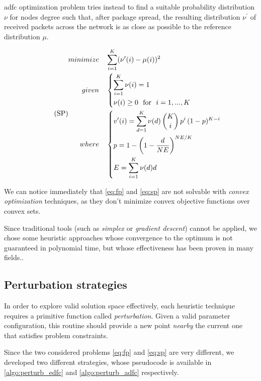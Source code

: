 \documentclass[12pt,journal,draftclsnofoot,onecolumn]{IEEEtran}
\begin{document}
\bigbreak

\gls{adfc} optimization problem tries instead to find a suitable probability distribution $\nu$ for nodes degree such that, after package spread, the resulting distribution $\nu^\prime$ of received packets across the network is as close as possible to the reference distribution $\mu$.

\begin{equation}
	\label{eq:sp}
	\tag{SP}
	\begin{split}
		minimize & \quad \sum_{i=1}^{K}(\nu'(i)-\mu(i))^2 \\
		given & \quad \begin{dcases}
			\sum_{i=1}^K \nu(i) = 1 \\
			\nu(i) \geq 0 \text{~~for~~} i=1,...,K
		\end{dcases} \\
		where & \quad
		\begin{dcases}
			v^\prime(i) = \sum_{d=1}^K \nu(d) \,\binom{K}{i} \, p^i \, (1-p)^{K-i} \\
			p = 1 - \left(1 -\frac{d}{N E}\right)^{{N E} / {K}} \\
			E = \sum_{i = 1}^{K} \nu(d) d
		\end{dcases}
	\end{split}
\end{equation} \vspace{0cm}

We can notice immediately that \autoref{eq:fp} and \autoref{eq:sp} are not solvable with \emph{convex optimization} techniques, as they don't minimize convex objective functions over convex sets.

Since traditional tools (such as \emph{simplex} or \emph{gradient descent}) cannot be applied, we chose some heuristic approaches whose convergence to the optimum is not guaranteed in polynomial time, but whose effectiveness has been proven in many fields.\cite{Edelkamp2010}.

\subsection{Perturbation strategies} \label{sec:perturbations}
In order to explore valid solution space effectively, each heuristic technique requires a primitive function called \emph{perturbation}.
Given a valid parameter configuration, this routine should provide a new point \emph{nearby} the current one that satisfies problem constraints.

\smallbreak
Since the two considered problems \autoref{eq:fp} and \autoref{eq:sp} are very different, we developed two different strategies, whose pseudocode is available in \autoref{algo:perturb_edfc} and \autoref{algo:perturb_adfc} respectively.
\end{document}
